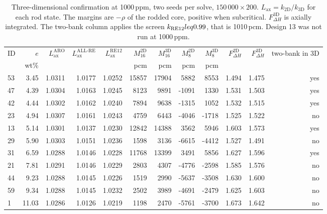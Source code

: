 \begin{table}[htbp]
  \centering
  \footnotesize
  \caption{Three-dimensional confirmation at 1000\,ppm, two seeds per solve, $150\,000 \times 200$. $L_\mathrm{ax} = k_\mathrm{2D}/k_\mathrm{3D}$ for each rod state. The margins are $-\rho$ of the rodded core, positive when subcritical. $F_{\Delta H}^\mathrm{3D}$ is axially integrated. The two-bank column applies the screen $k_\mathrm{RE12} \\leq 0.99$, that is 1010\,pcm. Design 13 was not run at 1000\,ppm.}
  \label{tab:c8-post-3d1000}
  \setlength{\tabcolsep}{3pt}\scriptsize
  \begin{tabular}{@{}l r r r r r r r r r r r@{}}
    \toprule
    ID & $e$ & $L_\mathrm{ax}^\mathrm{ARO}$ & $L_\mathrm{ax}^\mathrm{ALL\text{-}RE}$ & $L_\mathrm{ax}^\mathrm{RE12}$ & $M_{16}^\mathrm{2D}$ & $M_{16}^\mathrm{3D}$ & $M_8^\mathrm{2D}$ & $M_8^\mathrm{3D}$ & $F_{\Delta H}^\mathrm{2D}$ & $F_{\Delta H}^\mathrm{3D}$ & two-bank in 3D \\
       & wt\% &  &  &  & pcm & pcm & pcm & pcm &  &  &  \\
    \midrule
    53 & 3.45 & 1.0311 & 1.0177 & 1.0252 & 15857 & 17904 & 5882 & 8553 & 1.494 & 1.475 & yes \\
    47 & 4.39 & 1.0304 & 1.0163 & 1.0245 & 8123 & 9891 & -1091 & 1330 & 1.531 & 1.503 & yes \\
    42 & 4.44 & 1.0302 & 1.0162 & 1.0240 & 7894 & 9638 & -1315 & 1052 & 1.532 & 1.515 & yes \\
    23 & 4.94 & 1.0307 & 1.0161 & 1.0243 & 4759 & 6443 & -4046 & -1718 & 1.525 & 1.522 & no \\
    13 & 5.14 & 1.0301 & 1.0137 & 1.0230 & 12842 & 14388 & 3562 & 5946 & 1.603 & 1.573 & yes \\
    29 & 5.90 & 1.0303 & 1.0151 & 1.0236 & 1598 & 3136 & -6615 & -4412 & 1.527 & 1.491 & no \\
    31 & 6.59 & 1.0288 & 1.0146 & 1.0228 & 11768 & 13399 & 3491 & 5856 & 1.627 & 1.596 & yes \\
    21 & 7.81 & 1.0291 & 1.0146 & 1.0229 & 2803 & 4307 & -4776 & -2598 & 1.585 & 1.576 & no \\
    44 & 9.23 & 1.0288 & 1.0145 & 1.0226 & 1519 & 2990 & -5637 & -3508 & 1.630 & 1.600 & no \\
    59 & 9.34 & 1.0288 & 1.0145 & 1.0232 & 2502 & 3989 & -4691 & -2479 & 1.625 & 1.603 & no \\
    1 & 11.03 & 1.0286 & 1.0126 & 1.0219 & 1198 & 2470 & -5761 & -3700 & 1.673 & 1.642 & no \\
    \bottomrule
  \end{tabular}
\end{table}
